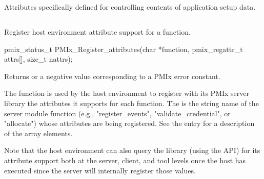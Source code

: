 Attributes specifically defined for controlling contents of application setup data.

%
%
%


\subsection{}

\summary

Register host environment attribute support for a function.

\format

\cspecificstart
\begin{codepar}
pmix_status_t
PMIx_Register_attributes(char *function,
                         pmix_regattr_t attrs[],
                         size_t nattrs);
\end{codepar}
\cspecificend

\begin{arglist}
\end{arglist}

Returns  or a negative value corresponding to a PMIx error constant.

\descr

The  function is used by the host environment to register with its \ac{PMIx} server library the attributes it supports for each  function. The  is the string name of the server module function (e.g., "register_events", "validate_credential", or "allocate") whose attributes are being registered. See the  entry for a description of the  array elements.

Note that the host environment can also query the library (using the  \ac{API}) for its attribute support both at the server, client, and tool levels once the host has executed  since the server will internally register those values.

